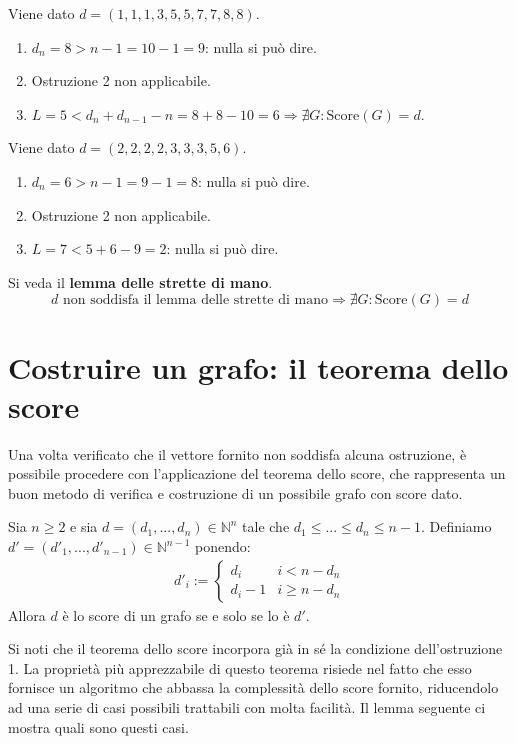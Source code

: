 \documentclass[oneside]{book}
\theoremstyle{remark}
\begin{document}
\begin{tcolorbox}[colback=blue!30, colframe=blue!30!black, title=Esempi]
Viene dato $d=(1,1,1,3,5,5,7,7,8,8)$.
\begin{enumerate}
\item $d_n=8>n-1=10-1=9$: nulla si può dire.
\item Ostruzione 2 non applicabile.
\item $L=5 < d_n+d_{n-1}-n=8+8-10 = 6 \Longrightarrow \nexists G:\text{Score}(G)=d$.
\end{enumerate}
Viene dato $d=(2,2,2,2,3,3,3,5,6)$.
\begin{enumerate}
\item $d_n=6>n-1=9-1=8$: nulla si può dire.
\item Ostruzione 2 non applicabile.
\item $L=7<5+6-9=2$: nulla si può dire.
\end{enumerate}
\end{tcolorbox}  

\begin{tcolorbox}[colback=red!30, colframe=red!30!black, title=Ostruzione 4]
Si veda il \textbf{lemma delle strette di mano}.
\[ d \text{ non soddisfa il lemma delle strette di mano} \Longrightarrow \nexists G:\text{Score}(G)=d \]
\end{tcolorbox}

\section{Costruire un grafo: il teorema dello score}
Una volta verificato che il vettore fornito non soddisfa alcuna ostruzione,
è possibile procedere con l'applicazione del teorema dello score, che
rappresenta un buon metodo di verifica e costruzione di un possibile grafo
con score dato.
\begin{tcolorbox}[title=Teorema dello Score]
Sia $n\geq2$ e sia $d=(d_1,...,d_n)\in\mathbb{N}^n$ tale che $d_1\leq...\leq d_n\leq n-1$.
Definiamo $d'=(d'_1,...,d'_{n-1})\in\mathbb{N}^{n-1}$ ponendo:
\begin{align*}
d'_i:=
\begin{cases}
    d_i   & i<n-d_n\\
    d_i-1 & i\geq n-d_n
\end{cases}
\end{align*}
Allora $d$ è lo score di un grafo se e solo se lo è $d'$.
\end{tcolorbox}

\noindent Si noti che il teorema dello score incorpora già in sé la condizione
dell'ostruzione 1. La proprietà più apprezzabile di questo teorema
risiede nel fatto che esso fornisce un algoritmo che abbassa la
complessità dello score fornito, riducendolo ad una serie di casi
possibili trattabili con molta facilità. Il lemma seguente ci mostra
quali sono questi casi.
\end{document}
